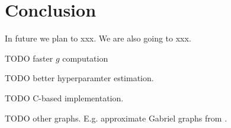 \section{Conclusion}\label{sec:CONCLUSION}
In future we plan to xxx. We are also going to xxx.

TODO faster $g$ computation

TODO better hyperparamter estimation.

TODO C-based implementation.

TODO other graphs. E.g. approximate Gabriel graphs from \cite{BhattacharyaGeometricPaper}.
